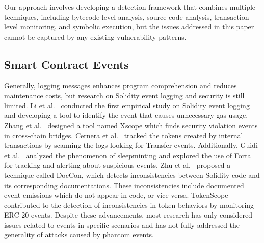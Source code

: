 Our approach involves developing a detection framework that combines multiple techniques, including bytecode-level analysis, source code analysis, transaction-level monitoring, and symbolic execution, but the issues addressed in this paper cannot be captured by any existing vulnerability patterns.

\subsection{Smart Contract Events}
Generally, logging messages enhances program comprehension and reduces maintenance costs, but
research on Solidity event logging and security is still limited. Li et
al.~\cite{li2023understanding} conducted the first empirical study on Solidity event logging and
developing a tool to identify the event that causes unnecessary gas usage. Zhang et
al.~\cite{Xscope} designed a tool named Xscope which finds
security violation events in cross-chain bridges. Cernera et al.~\cite{cernera2023token} tracked
the tokens created by internal transactions by scanning the logs looking for Transfer events.
Additionally, Guidi et al.~\cite{sleepminting} analyzed the phenomenon of sleepminting and explored the use of Forta for
tracking and alerting about suspicious events.
Zhu et al.~\cite{doccon} proposed a technique called DocCon, which detects inconsistencies between
Solidity code and its corresponding documentations. These inconsistencies include documented event
emissions which do not appear in code, or vice versa.
TokenScope \cite{TokenScope} contributed to the detection of inconsistencies in token behaviors by monitoring ERC-20 events.
Despite these advancements, most research has only considered issues related to events in specific
scenarios and has not fully addressed the generality of attacks caused by phantom events.

\label{sec:related}